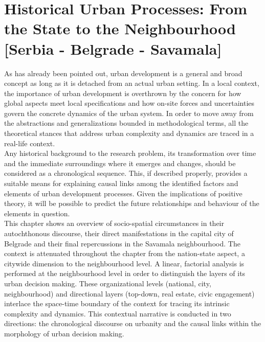 \documentclass[11pt]{report}
\begin{document}
{{{{%


\chapter{Historical Urban Processes: From the State to the Neighbourhood [Serbia - Belgrade - Savamala]}

As has already been pointed out, urban development is a general and broad concept as long as it is detached from an actual urban setting. In a local context, the importance of urban development is overthrown by the concern for how global aspects meet local specifications and how on-site forces and uncertainties govern the concrete dynamics of the urban system. In order to move away from the abstractions and generalizations bounded in methodological terms, all the theoretical stances that address urban complexity and dynamics are traced in a real-life context.
\\

Any historical background to the research problem, its transformation over time and the immediate surroundings where it emerges and changes, should be considered as a chronological sequence. This, if described properly, provides a suitable means for explaining causal links among the identified factors and elements of urban development processes. Given the implications of positive theory, it will be possible to predict the future relationships and behaviour of the elements in question.
\\

This chapter shows an overview of socio-spatial circumstances in their autochthonous discourse, their direct manifestations in the capital city of Belgrade and their final repercussions in the Savamala neighbourhood. The context is attenuated throughout the chapter from the nation-state aspect, a citywide dimension to the neighbourhood level. A linear, factorial analysis is performed at the neighbourhood level in order to distinguish the layers of its urban decision making. These organizational levels (national, city, neighbourhood) and directional layers (top-down, real estate, civic engagement) interlace the space-time boundary of the context for tracing its intrinsic complexity and dynamics. This contextual narrative is conducted in two directions: the chronological discourse on urbanity and the causal links within the morphology of urban decision making.

}}}}
\end{document}
